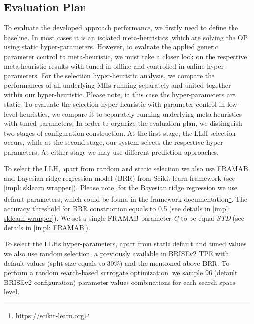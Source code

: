 \subsection{Evaluation Plan}\label{eval:1:plan}
To evaluate the developed approach performance, we firstly need to define the baseline. In most cases it is an isolated meta-heuristics, which are solving the OP using static hyper-parameters. However, to evaluate the applied generic parameter control to meta-heuristic, we must take a closer look on the respective meta-heuristic results with tuned in offline and controlled in online hyper-parameters. For the selection hyper-heuristic analysis, we compare the performances of all underlying MHs running separately and united together within our hyper-heuristic. Please note, in this case the hyper-parameters are static. To evaluate the selection hyper-heuristic with parameter control in low-level heuristics, we compare it to separately running underlying meta-heuristics with tuned parameters. In order to organize the evaluation plan, we distinguish two stages of configuration construction. At the first stage, the LLH selection occurs, while at the second stage, our system selects the respective hyper-parameters. At either stage we may use different prediction approaches. 

To select the LLH, apart from random and static selection we also use FRAMAB and Bayesian ridge regression model (BRR) from Scikit-learn framework (see \cref{impl: sklearn wrapper}). Please note, for the Bayesian ridge regression we use default parameters, which could be found in the framework documentation\footnote{\href{https://scikit-learn.org/stable/modules/generated/sklearn.linear_model.BayesianRidge.html}{https://scikit-learn.org}}. The accuracy threshold for BRR construction equals to 0.5 (see details in \cref{impl: sklearn wrapper}). We set a single FRAMAB parameter \emph{C} to be equal \emph{STD} (see details in \cref{impl: FRAMAB}). 

To select the LLHs hyper-parameters, apart from static default and tuned values we also use random selection, a previously available in BRISEv2 TPE with default values (split size equals to 30\%) and the mentioned above BRR. To perform a random search-based surrogate optimization, we sample 96 (default BRISEv2 configuration) parameter values combinations for each search space level.

